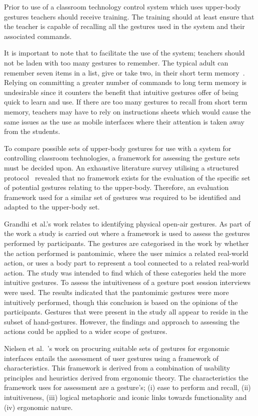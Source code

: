 \documentclass[manuscript, review, screen]{acmart}
\begin{document}
Prior to use of a classroom technology control system which uses upper-body gestures teachers should receive training.
The training should at least ensure that the teacher is capable of recalling all the gestures used in the system and their associated commands.

It is important to note that to facilitate the use of the system; teachers should not be laden with too many gestures to remember.
The typical adult can remember seven items in a list, give or take two, in their short term memory~\cite{mil56}.
Relying on committing a greater number of commands to long term memory is undesirable since it counters the benefit that intuitive gestures offer of being quick to learn and use.
If there are too many gestures to recall from short term memory, teachers may have to rely on instructions sheets which would cause the same issues as the use as mobile interfaces where their attention is taken away from the students.

To compare possible sets of upper-body gestures for use with a system for controlling classroom technologies, a framework for assessing the gesture sets must be decided upon.
An exhaustive literature survey utilising a structured protocol~\cite{kitchenham04} revealed that no framework exists for the evaluation of the specific set of potential gestures relating to the upper-body.
Therefore, an evaluation framework used for a similar set of gestures was required to be identified and adapted to the upper-body set.

Grandhi et al.'s \citeyearpar{Grandhi2011} work relates to identifying physical open-air gestures.
As part of the work a study is carried out where a framework is used to assess the gestures performed by participants.
The gestures are categorised in the work by whether the action performed is pantomimic, where the user mimics a related real-world action, or uses a body part to represent a tool connected to a related real-world action.
The study was intended to find which of these categories held the more intuitive gestures.
To assess the intuitiveness of a gesture post session interviews were used.
The results indicated that the pantomimic gestures were more intuitively performed, though this conclusion is based on the opinions of the participants.
Gestures that were present in the study all appear to reside in the subset of hand-gestures.
However, the findings and approach to assessing the actions could be applied to a wider scope of gestures.

Nielsen et al.~\citeyearpar{Nielsen2004}'s work on procuring suitable sets of gestures for ergonomic interfaces entails the assessment of user gestures using a framework of characteristics.
This framework is derived from a combination of usability principles and heuristics derived from ergonomic theory.
The characteristics the framework uses for assessment are a gesture's; (i) ease to perform and recall, (ii) intuitiveness, (iii) logical metaphoric and iconic links towards functionality and (iv) ergonomic nature.
\end{document}
